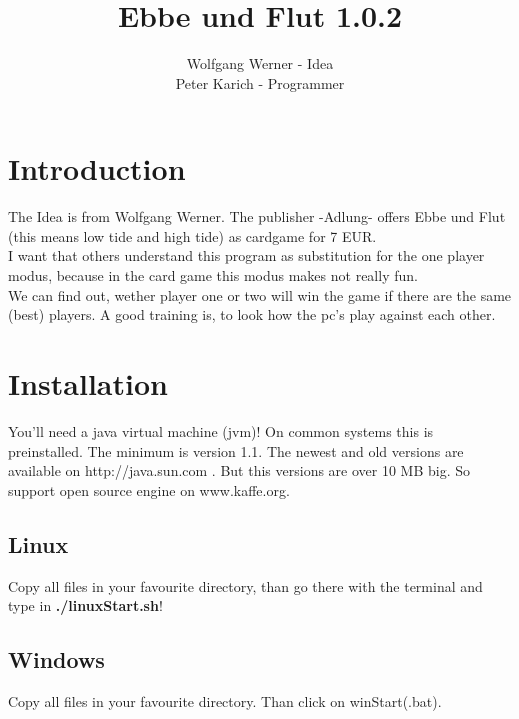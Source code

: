 \documentclass[12pt]{article}
\begin{document}
\title{ \bf \LARGE Ebbe und Flut 1.0.2}

\author{Wolfgang Werner - Idea\\
        Peter Karich - Programmer\\ }
\maketitle


\setcounter{tocdepth}{2}
\tableofcontents

\newpage
\pagestyle{headings}

\section{Introduction}
The Idea is from Wolfgang Werner. The publisher  -Adlung- offers Ebbe und Flut 
(this means low tide and high tide) as cardgame for 7 EUR.\\
I want that others understand this program as substitution for the one player modus, because in
the card game this modus makes not really fun.\\
We can find out, wether player one or two will win the game if there are the same (best) players.
A good training is, to look how the pc's play against each other.
\section{Installation}
You'll need a java virtual machine (jvm)! On common systems this is preinstalled. The minimum is version 1.1.
The newest and old versions are available on http://java.sun.com . But this versions are over 10 MB big. 
So support open source engine on www.kaffe.org.
\subsection{Linux}
Copy all files in your favourite directory, than go there with the terminal and type in {\bf ./linuxStart.sh}!
\subsection{Windows}
Copy all files in your favourite directory. Than click on winStart(.bat).
\end{document}
